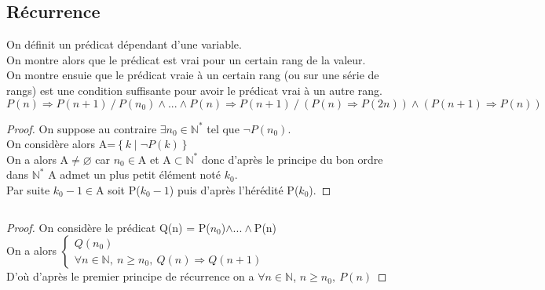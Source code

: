     \subsection{Récurrence}
        On définit un prédicat dépendant d'une variable.
        \\On montre alors que le prédicat est vrai pour un certain rang de la valeur.
        \\On montre ensuie que le prédicat vraie à un certain rang (ou sur une série de rangs) est une condition suffisante pour avoir le prédicat vrai à un autre rang.
        $$P(n)\Rightarrow P(n+1)~/~P(n_0)\wedge ...\wedge P(n)\Rightarrow P(n+1)~/~(P(n)\Rightarrow P(2n))\wedge (P(n+1)\Rightarrow P(n))$$
        \begin{proof}
        On suppose au contraire $\exists n_0\in\mathbb{N} ^*$ tel que $\neg P(n_0)$.
        \\On considère alors A=$\left\{ 
        k \mid \neg P(k)
        \right\}$ 
        \\On a alors A$\neq\varnothing$ car $n_0\in$A et A$\subset\mathbb{N} ^*$ donc d'après le principe du bon ordre dans $\mathbb{N} ^*$ A admet un plus petit élément noté $k_0$. 
        \\Par suite $k_0-1\in$A soit P($k_0-1$) puis d'après l'hérédité P($k_0$).
        \end{proof} ${}$\\
        \begin{proof}
        On considère le prédicat Q(n) = P($n_0$)$\wedge ...\wedge$P(n)
        \\ On a alors
        $\left\{
        \begin{array}{l}
        Q(n_0)\\
        \forall n\in\mathbb{N} ,~n\geq n_0,~Q(n)\Rightarrow Q(n+1)
        \end{array}
        \right.$
        \\ D'où d'après le premier principe de récurrence on a $\forall n\in\mathbb{N}$, $n\geq n_0, ~ P(n)$
        \end{proof}

